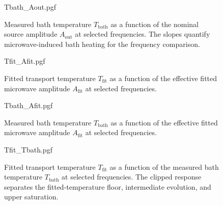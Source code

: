     \begin{figure}[t]
        \centering
        {Tbath_Aout.pgf}
        \caption{
            Measured bath temperature $T_\mathrm{bath}$ as a function of the nominal source amplitude $A_\mathrm{out}$ at selected frequencies. The slopes quantify microwave-induced bath heating for the frequency comparison.
        }
        \label{fig:tb:asym:control-Tbath_Aout}
    \end{figure}

    \begin{figure}[t]
        \centering
        {Tfit_Afit.pgf}
        \caption{
            Fitted transport temperature $T_\mathrm{fit}$ as a function of the effective fitted microwave amplitude $A_\mathrm{fit}$ at selected frequencies.
        }
        \label{fig:tb:asym:control-Tfit_Afit}
    \end{figure}

    \begin{figure}[t]
        \centering
        {Tbath_Afit.pgf}
        \caption{
            Measured bath temperature $T_\mathrm{bath}$ as a function of the effective fitted microwave amplitude $A_\mathrm{fit}$ at selected frequencies.
        }
        \label{fig:tb:asym:control-Tbath_Afit}
    \end{figure}

    \begin{figure}[t]
        \centering
        {Tfit_Tbath.pgf}
        \caption{
            Fitted transport temperature $T_\mathrm{fit}$ as a function of the measured bath temperature $T_\mathrm{bath}$ at selected frequencies. The clipped response separates the fitted-temperature floor, intermediate evolution, and upper saturation.
        }
        \label{fig:tb:asym:control-Tfit_Tbath}
    \end{figure}
